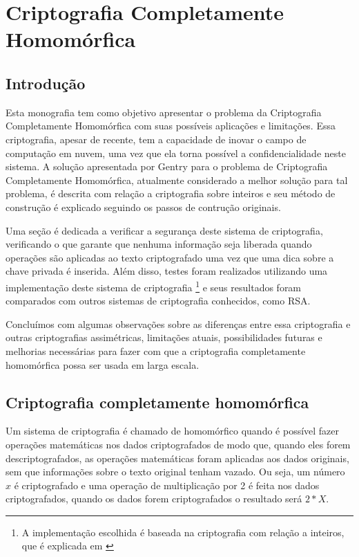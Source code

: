 \chapter{Criptografia Completamente Homomórfica}\label{chp:LABEL_CHP_1}

\section{Introdução}\label{sec:LABEL_CHP_1_SEC_A}
Esta monografia tem como objetivo apresentar o problema da Criptografia Completamente Homomórfica com suas possíveis aplicações e limitações.
Essa criptografia, apesar de recente, tem a capacidade de inovar o campo de computação em nuvem, uma vez que ela torna possível a confidencialidade neste sistema.
A solução apresentada por Gentry para o problema de Criptografia Completamente Homomórfica, atualmente considerado a melhor solução para tal problema, é descrita com relação a criptografia sobre inteiros e seu método de construção é explicado seguindo os passos de contrução originais.

Uma seção é dedicada a verificar a segurança deste sistema de criptografia, verificando o que garante que nenhuma informação seja liberada quando operações são aplicadas ao texto criptografado uma vez que uma dica sobre a chave privada é inserida.
Além disso, testes foram realizados utilizando uma implementação deste sistema de criptografia \footnote{A implementação escolhida é baseada na criptografia com relação a inteiros, que é explicada em \cite{art:REF_ART_1}} e seus resultados foram comparados com outros sistemas de criptografia conhecidos, como RSA.

Concluímos com algumas observações sobre as diferenças entre essa criptografia e outras criptografias assimétricas, limitações atuais, possibilidades futuras e melhorias necessárias para fazer com que a criptografia completamente homomórfica possa ser usada em larga escala.

\newpage

\section{Criptografia completamente homomórfica}\label{sec:LABEL_CHP_1_SEC_B}
Um sistema de criptografia é chamado de homomórfico quando é possível fazer operações matemáticas nos dados criptografados de modo que, quando eles forem descriptografados, as operações matemáticas foram aplicadas aos dados originais, sem que informações sobre o texto original tenham vazado.
Ou seja, um número \(x\) é criptografado e uma operação de multiplicação por 2 é feita nos dados criptografados, quando os dados forem criptografados o resultado será \(2*X\).

